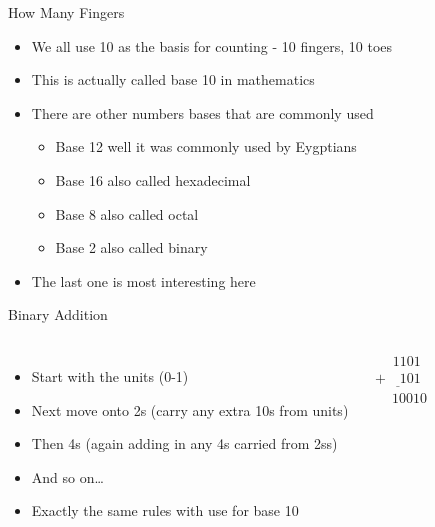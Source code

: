 \documentclass{beamer}
\begin{document}
\begin{frame}{How Many Fingers}
  \begin{itemize}
  \item
    We all use 10 as the basis for counting - 10 fingers, 10 toes
  \item
    This is actually called base 10 in mathematics
  \item
    There are other numbers bases that are commonly used
    \begin{itemize}
    \item
      Base 12 well it was commonly used by Eygptians 
    \item
      Base 16 also called hexadecimal
    \item
      Base 8 also called octal
    \item
      Base 2 also called binary
    \end{itemize}
  \item
    The last one is most interesting here
  \end{itemize}
\end{frame}



\begin{frame}{Binary Addition}
  \begin{columns}
    \begin{itemize}
    \item
      Start with the units (0-1) 
    \item
      Next move onto 2s (carry any extra 10s from units)
    \item
      Then 4s (again adding in any 4s carried from 2ss)
    \item
      And so on\dots
    \item
      Exactly the same rules with use for base 10
    \end{itemize}

    \begin{equation*}
      \begin{array}{c}
        \phantom{+9}1101\\
        \underline{+\phantom{99}101}\\
        \phantom{+}10010\\
      \end{array}
    \end{equation*}
  \end{columns}
  
\end{frame}
\end{document}

